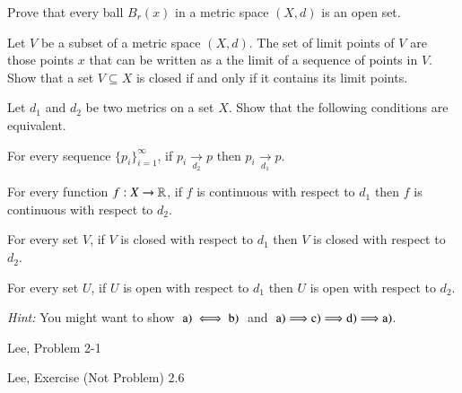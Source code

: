\documentclass[minion]{homework651}
\newcommand\converges[1]{\mathrel{\mathop{\longrightarrow}\limits_{#1}}}
\begin{document}
\begin{aproblems}
\hproblem Prove that every ball $B_r(x)$ in a metric space $(X,d)$ is an open set.

\hproblem Let $V$ be a subset of a metric space $(X,d)$.  The set of limit
points of $V$ are those points $x$ that can be written as a the limit of a 
sequence of points in $V$.  Show that a set $V\subseteq X$ is closed if and only if
it contains its limit points.

\hproblem Let $d_1$ and $d_2$ be two metrics on a set $X$.  Show that the following
conditions are equivalent.
\begin{subproblems}
\item For every sequence $\{ p_i\}_{i=1}^\infty$, if $p_i\converges{d_2} p$ 
then $p_i\converges{d_1} p$.
\item For every function $f:X\rightarrow \mathbb R$, if $f$ is continuous with 
respect to $d_1$ then $f$ is continuous with respect to $d_2$.
\item For every set $V$, if $V$ is closed with respect to $d_1$ then
$V$ is closed with respect to $d_2$.
\item For every set $U$, if $U$ is open with respect to $d_1$ then
$U$ is open with respect to $d_2$.
\end{subproblems}

{\it Hint:} You might want to show $\;{\rm a)} \iff {\rm b)}\;$ and $\;{\rm a)} \Longrightarrow {\rm c)} \Longrightarrow {\rm d)} 
\Longrightarrow {\rm a)}$.

\hproblem Lee, Problem 2-1

\hproblem Lee, Exercise (Not Problem) 2.6


\end{aproblems}
\end{document}
